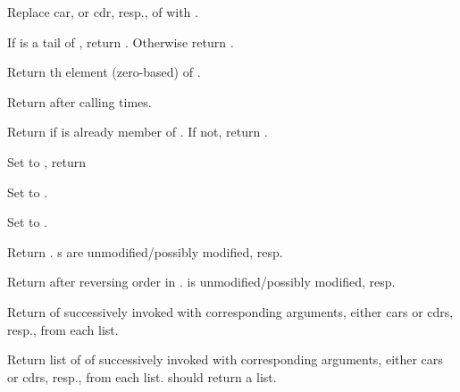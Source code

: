 \begin{LIST}{1cm}
  Replace car, or cdr, resp., of  with .

  If  is a tail of , return . Otherwise return .

   Return th element (zero-based) of .

   Return  after calling   times.

    Return  if  is
  already member of . If not, return .

  Set  to , return

   Set  to
  .

   Set  to
  .

  Return . s are unmodified/possibly
  modified, resp.

  Return  after reversing order in
  .  is unmodified/possibly
  modified, resp.

  Return
   of
   successively invoked with corresponding arguments,
  either cars or cdrs, resp.,
  from each list.

  Return list of 
   of
   successively invoked with corresponding arguments,
  either cars or cdrs, resp.,
  from each list.  should return a list.


\end{LIST}
